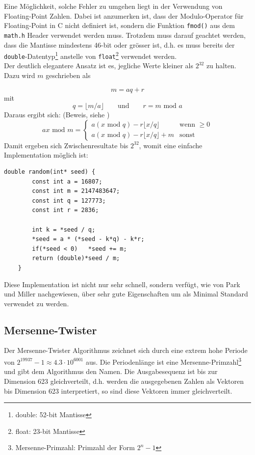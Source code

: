 \documentclass{book}
\begin{document}
\begin{refsection}
Eine Möglichkeit, solche Fehler zu umgehen liegt in der Verwendung von Floating-Point Zahlen. Dabei ist anzumerken ist, dass der Modulo-Operator für Floating-Point in C nicht definiert ist, sondern die Funktion \texttt{fmod()} aus dem \texttt{math.h} Header verwendet werden muss. Trotzdem muss darauf geachtet werden, dass die Mantisse mindestens 46-bit oder grösser ist, d.h. es muss bereits der \texttt{double}-Datentyp\footnote{double: 52-bit Mantisse} anstelle von \texttt{float}\footnote{float: 23-bit Mantisse} verwendet werden. \\

Der deutlich elegantere Ansatz ist es, jegliche Werte kleiner als $2^{32}$ zu halten. Dazu wird $m$ geschrieben als

\begin{equation}
	m = aq + r
\end{equation}
mit 
\begin{equation}
	q = \lfloor m/a \rfloor \qquad \text{und} \qquad r = m \text{ mod } a
\end{equation}
Daraus ergibt sich: (Beweis, siehe \cite{rng:ParkMiller1988})
\begin{equation}
	a x \text{ mod } m = 
		\begin{cases}
			a \left(x \text{ mod } q\right) - r \lfloor x / q\rfloor & \text{wenn }\geq 0 \\
			a \left(x \text{ mod } q\right) - r \lfloor x / q\rfloor + m & \text{sonst}
		\end{cases}
\end{equation}
Damit ergeben sich Zwischenresultate bis $2^{32}$, womit eine einfache Implementation möglich ist:

\begin{lstlisting}[style=C]
	double random(int* seed) {
		const int a = 16807;
		const int m = 2147483647;
		const int q = 127773;
		const int r = 2836;
		
		int k = *seed / q;
		*seed = a * (*seed - k*q) - k*r;
		if(*seed < 0)   *seed += m;
		return (double)*seed / m;
	}
\end{lstlisting}
Diese Implementation ist nicht nur sehr schnell, sondern verfügt, wie von Park und Miller \cite{rng:ParkMiller1988} nachgewiesen, über sehr gute Eigenschaften um als Minimal Standard verwendet zu werden.

\subsection{Mersenne-Twister} \label{subsec:MersenneTwister}
Der Mersenne-Twister Algorithmus zeichnet sich durch eine extrem hohe Periode von $2^{19937}-1 \approx 4.3 \cdot 10^{6001}$ aus. Die Periodenlänge ist eine Mersenne-Primzahl\footnote{Mersenne-Primzahl: Primzahl der Form $2^{n}-1$} und gibt dem Algorithmus den Namen. Die Ausgabesequenz ist bis zur Dimension 623 gleichverteilt, d.h. werden die ausgegebenen Zahlen als Vektoren bis Dimension 623 interpretiert, so sind diese Vektoren immer gleichverteilt. \\


\end{refsection}
\end{document}
